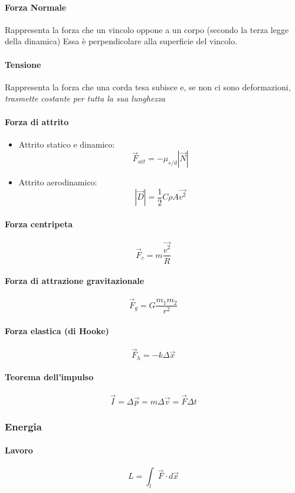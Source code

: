 \documentclass[12pt]{article}
\begin{document}
            \paragraph*{Forza Normale}
            Rappresenta la forza che un vincolo oppone a un corpo (secondo la terza legge della dinamica)
            Essa è perpendicolare alla superficie del vincolo.
            \paragraph*{Tensione}
            Rappresenta la forza che una corda tesa subisce e, se non ci sono deformazioni, \emph{trasmette costante per tutta la sua lunghezza}
            \paragraph*{Forza di attrito}
            \begin{itemize}
                \item Attrito statico e dinamico: \[\vec{F}_{att} = - \mu_{s/d}|\vec{N}|\]
                \item Attrito aerodinamico: \[|\vec{D}| = \frac{1}{2}C\rho A\vec{v^2}\]
            \end{itemize}
            \paragraph*{Forza centripeta}
            \[\vec{F}_c = m\frac{\vec{v^2}}{R}\]
            \paragraph*{Forza di attrazione gravitazionale}
            \[\vec{F}_g = G\frac{m_1 m_2}{r^2}\]
            \paragraph*{Forza elastica (di Hooke)}
            \[\vec{F}_h = -k\Delta \vec{x}\]
            \paragraph*{Teorema dell'impulso}
            \[\vec{I} = \Delta\vec{p} = m\Delta\vec{v} = \vec{F}\Delta t\]
        \subsubsection{Energia}
            \paragraph*{Lavoro}
            \[L = \int_{l}{\vec{F} \cdot d \vec{x}}\]
\end{document}
